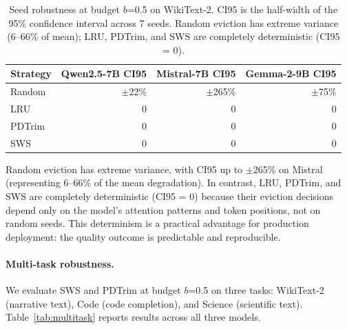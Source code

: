 \documentclass[11pt]{article}
\newcommand{\sws}{SWS}
\newcommand{\pct}{\%}
\theoremstyle{definition}
\theoremstyle{plain}
\begin{document}
\begin{table}[t]
\centering
\caption{Seed robustness at budget $b$=0.5 on WikiText-2.  CI95 is the half-width of the 95\% confidence interval across 7 seeds.  Random eviction has extreme variance (6--66\pct{} of mean); LRU, PDTrim, and \sws{} are completely deterministic (CI95 = 0).}
\label{tab:seed-robust}
\small
\begin{tabular}{lrrr}
\toprule
Strategy & Qwen2.5-7B CI95 & Mistral-7B CI95 & Gemma-2-9B CI95 \\
\midrule
Random & $\pm$22\pct{} & $\pm$265\pct{} & $\pm$75\pct{} \\
LRU & 0 & 0 & 0 \\
PDTrim & 0 & 0 & 0 \\
\sws{} & 0 & 0 & 0 \\
\bottomrule
\end{tabular}
\end{table}

Random eviction has extreme variance, with CI95 up to $\pm$265\pct{} on Mistral (representing 6--66\pct{} of the mean degradation).  In contrast, LRU, PDTrim, and \sws{} are completely deterministic (CI95 = 0) because their eviction decisions depend only on the model's attention patterns and token positions, not on random seeds.  This determinism is a practical advantage for production deployment: the quality outcome is predictable and reproducible.

\paragraph{Multi-task robustness.}  We evaluate \sws{} and PDTrim at budget $b$=0.5 on three tasks: WikiText-2 (narrative text), Code (code completion), and Science (scientific text).  Table~\ref{tab:multitask} reports results across all three models.
\end{document}
